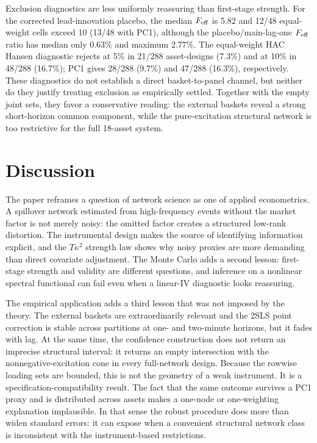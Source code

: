 \documentclass[12pt]{article}
\theoremstyle{plain}\newtheorem{theorem}{Theorem}[section]\newtheorem{proposition}[theorem]{Proposition}\newtheorem{lemma}[theorem]{Lemma}\newtheorem{corollary}[theorem]{Corollary}
\theoremstyle{definition}\newtheorem{definition}[theorem]{Definition}\newtheorem{assumption}[theorem]{Assumption}\newtheorem{remark}[theorem]{Remark}
\begin{document}
Exclusion diagnostics are less uniformly reassuring than first-stage strength. For the corrected lead-innovation placebo, the median $F_{\rm eff}$ is 5.82 and 12/48 equal-weight cells exceed 10 (13/48 with PC1), although the placebo/main-lag-one $F_{\rm eff}$ ratio has median only 0.63\% and maximum 2.77\%. The equal-weight HAC Hansen diagnostic rejects at 5\% in 21/288 asset-designs (7.3\%) and at 10\% in 48/288 (16.7\%); PC1 gives 28/288 (9.7\%) and 47/288 (16.3\%), respectively. These diagnostics do not establish a direct basket-to-panel channel, but neither do they justify treating exclusion as empirically settled. Together with the empty joint sets, they favor a conservative reading: the external baskets reveal a strong short-horizon common component, while the pure-excitation structural network is too restrictive for the full 18-asset system.

\section{Discussion}\label{sec:disc}
The paper reframes a question of network science as one of applied econometrics. A spillover network estimated from high-frequency events without the market factor is not merely noisy: the omitted factor creates a structured low-rank distortion. The instrumental design makes the source of identifying information explicit, and the $T\kappa^2$ strength law shows why noisy proxies are more demanding than direct covariate adjustment. The Monte Carlo adds a second lesson: first-stage strength and validity are different questions, and inference on a nonlinear spectral functional can fail even when a linear-IV diagnostic looks reassuring.

The empirical application adds a third lesson that was not imposed by the theory. The external baskets are extraordinarily relevant and the 2SLS point correction is stable across partitions at one- and two-minute horizons, but it fades with lag. At the same time, the confidence construction does not return an imprecise structural interval: it returns an empty intersection with the nonnegative-excitation cone in every full-network design. Because the rowwise loading sets are bounded, this is not the geometry of a weak instrument. It is a specification-compatibility result. The fact that the same outcome survives a PC1 proxy and is distributed across assets makes a one-node or one-weighting explanation implausible. In that sense the robust procedure does more than widen standard errors: it can expose when a convenient structural network class is inconsistent with the instrument-based restrictions.
\end{document}
